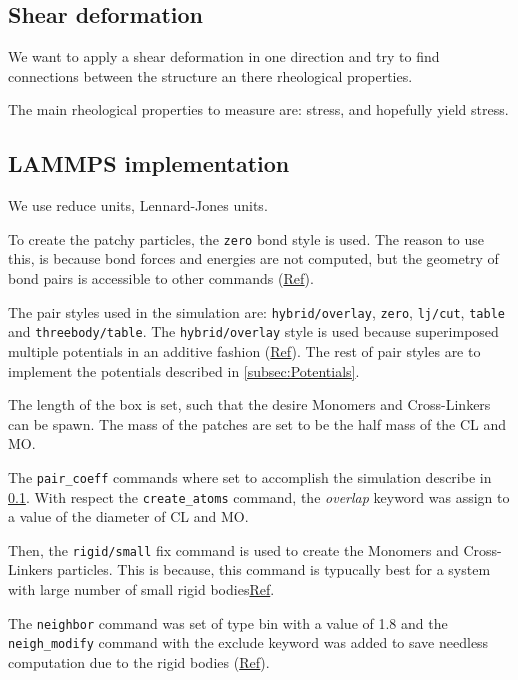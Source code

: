 \documentclass[main.tex]{subfiles}
\begin{document}
\subsection{Shear deformation}\label{sec:descriptionSimulation}

We want to apply a shear deformation in one direction and try to find connections between the structure an there rheological properties.

The main rheological properties to measure are: stress, and hopefully yield stress.

\subsection{LAMMPS implementation}

We use reduce units, Lennard-Jones units.

To create the patchy particles, the \verb|zero| bond style is used.
The reason to use this, is because bond forces and energies are not computed, but the geometry of bond pairs is accessible to other commands (\href{https://docs.lammps.org/bond_zero.html}{Ref}).

The pair styles used in the simulation are: \verb|hybrid/overlay|, \verb|zero|, \verb|lj/cut|, \verb|table| and \verb|threebody/table|.
The \verb|hybrid/overlay| style is used because superimposed multiple potentials in an additive fashion (\href{https://docs.lammps.org/pair_hybrid.html}{Ref}).
The rest of pair styles are to implement the potentials described in \ref{subsec:Potentials}.

The length of the box is set, such that the desire Monomers and Cross-Linkers can be spawn.
The mass of the patches are set to be the half mass of the CL and MO.

The \verb|pair_coeff| commands where set to accomplish the simulation describe in \ref{sec:descriptionSimulation}.
With respect the \verb|create_atoms| command, the \textit{overlap} keyword was assign to a value of the diameter of CL and MO.

Then, the \verb|rigid/small| fix command is used to create the Monomers and Cross-Linkers particles.
This is because, this command is typucally best for a system with large number of small rigid bodies\href{https://docs.lammps.org/fix_rigid.html}{Ref}.

The \verb|neighbor| command was set of type bin with a value of 1.8 and the \verb|neigh_modify| command with the exclude keyword was added to save needless computation due to the rigid bodies (\href{https://docs.lammps.org/neigh_modify.html}{Ref}).
\end{document}
